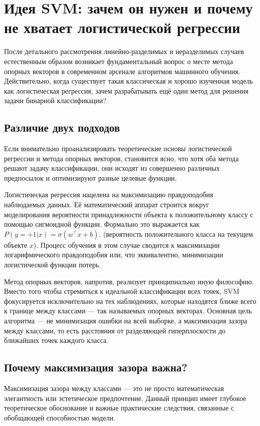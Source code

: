 \section{Идея SVM: зачем он нужен и почему не хватает логистической регрессии}

После детального рассмотрения линейно-разделимых и неразделимых случаев естественным образом возникает фундаментальный вопрос о месте метода опорных векторов в современном арсенале алгоритмов машинного обучения. Действительно, когда существует такая классическая и хорошо изученная модель как логистическая регрессия, зачем разрабатывать ещё один метод для решения задачи бинарной классификации?

\subsection{Различие двух подходов}

Если внимательно проанализировать теоретические основы логистической регрессии и метода опорных векторов, становится ясно, что хотя оба метода решают задачу классификации, они исходят из совершенно различных предпосылок и оптимизируют разные целевые функции. 

Логистическая регрессия нацелена на максимизацию правдоподобия наблюдаемых данных. Её математический аппарат строится вокруг моделирования вероятности принадлежности объекта к положительному классу с помощью сигмоидной функции. Формально это выражается как $P(y = +1 | x) = \sigma(w^\top x + b)$. (вероятность положительного класса на текущем объекте $x$). Процесс обучения в этом случае сводится к максимизации логарифмического правдоподобия или, что эквивалентно, минимизации логистической функции потерь.

Метод опорных векторов, напротив, реализует принципиально иную философию. Вместо того чтобы стремиться к идеальной классификации всех точек, SVM фокусируется исключительно на тех наблюдениях, которые находятся ближе всего к границе между классами — так называемых опорных векторах. Основная цель алгоритма — не минимизация ошибки на всей выборке, а максимизация зазора между классами, то есть расстояния от разделяющей гиперплоскости до ближайших точек каждого класса.

\subsection{Почему максимизация зазора важна?}

Максимизация зазора между классами — это не просто математическая элегантность или эстетическое предпочтение. Данный принцип имеет глубокое теоретическое обоснование и важные практические следствия, связанные с обобщающей способностью модели.

